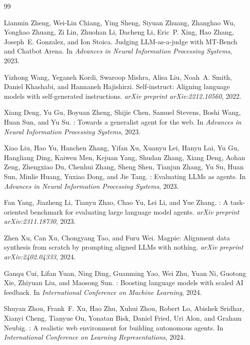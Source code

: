 \begin{thebibliography}{99}

Lianmin Zheng, Wei-Lin Chiang, Ying Sheng, Siyuan Zhuang, Zhanghao Wu, Yonghao Zhuang, Zi Lin, Zhuohan Li, Dacheng Li, Eric~P. Xing, Hao Zhang, Joseph~E. Gonzalez, and Ion Stoica.
\newblock Judging {LLM}-as-a-judge with {MT-Bench} and {Chatbot Arena}.
\newblock In \emph{Advances in Neural Information Processing Systems}, 2023.

Yizhong Wang, Yeganeh Kordi, Swaroop Mishra, Alisa Liu, Noah~A. Smith, Daniel Khashabi, and Hannaneh Hajishirzi.
\newblock Self-instruct: Aligning language models with self-generated instructions.
\newblock \emph{arXiv preprint arXiv:2212.10560}, 2022.

Xiang Deng, Yu Gu, Boyuan Zheng, Shijie Chen, Samuel Stevens, Boshi Wang, Huan Sun, and Yu Su.
: Towards a generalist agent for the web.
\newblock In \emph{Advances in Neural Information Processing Systems}, 2023.

Xiao Liu, Hao Yu, Hanchen Zhang, Yifan Xu, Xuanyu Lei, Hanyu Lai, Yu Gu, Hangliang Ding, Kaiwen Men, Kejuan Yang, Shudan Zhang, Xiang Deng, Aohan Zeng, Zhengxiao Du, Chenhui Zhang, Sheng Shen, Tianjun Zhang, Yu Su, Huan Sun, Minlie Huang, Yuxiao Dong, and Jie Tang.
: Evaluating {LLMs} as agents.
\newblock In \emph{Advances in Neural Information Processing Systems}, 2023.

Fan Yang, Jiazheng Li, Tianyu Zhao, Chao Yu, Lei Li, and Yue Zhang.
: A task-oriented benchmark for evaluating large language model agents.
\newblock \emph{arXiv preprint arXiv:2311.18730}, 2023.

Zhen Xu, Can Xu, Chongyang Tao, and Furu Wei.
\newblock Magpie: Alignment data synthesis from scratch by prompting aligned {LLMs} with nothing.
\newblock \emph{arXiv preprint arXiv:2402.04333}, 2024.

Ganqu Cui, Lifan Yuan, Ning Ding, Guanming Yao, Wei Zhu, Yuan Ni, Guotong Xie, Zhiyuan Liu, and Maosong Sun.
: Boosting language models with scaled {AI} feedback.
\newblock In \emph{International Conference on Machine Learning}, 2024.

Shuyan Zhou, Frank~F. Xu, Hao Zhu, Xuhui Zhou, Robert Lo, Abishek Sridhar, Xianyi Cheng, Tianyue Ou, Yonatan Bisk, Daniel Fried, Uri Alon, and Graham Neubig.
: A realistic web environment for building autonomous agents.
\newblock In \emph{International Conference on Learning Representations}, 2024.


\end{thebibliography}
